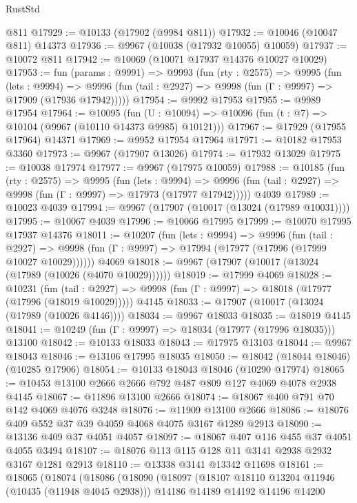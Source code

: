 \begin{lexlean}{RustStd}
\begin{coremodule}
    @811
@17929 := @10133 (@17902 (@9984 @811))
@17932 := @10046 (@10047 @811) @14373
@17936 := @9967 (@10038 (@17932 @10055) @10059)
@17937 := @10072 @811
@17942 := @10069 (@10071 @17937 @14376 @10027 @10029)
@17953 := fun (params : @9991) =>
  @9993
    (fun (rty : @2575) =>
    @9995
      (fun (lets : @9994) =>
      @9996 (fun (tail : @2927) => @9998 (fun (Γ : @9997) => @17909 (@17936 @17942)))))
@17954 := @9992 @17953
@17955 := @9989 @17954
@17964 := @10095
    (fun (U : @10094) => @10096 (fun (t : @7) => @10104 (@9967 (@10110 @14373 @9985) @10121)))
@17967 := @17929 (@17955 @17964) @14371
@17969 := @9952 @17954 @17964
@17971 := @10182 @17953 @3360
@17973 := @9967 (@17907 @13026)
@17974 := @17932 @13029
@17975 := @10038 @17974
@17977 := @9967 (@17975 @10059)
@17988 := @10185
    (fun (rty : @2575) =>
    @9995
      (fun (lets : @9994) =>
      @9996 (fun (tail : @2927) => @9998 (fun (Γ : @9997) => @17973 (@17977 @17942)))))
    @4039
@17989 := @10023 @4039
@17994 := @9967 (@17907 (@10017 (@13024 (@17989 @10031))))
@17995 := @10067 @4039
@17996 := @10066 @17995
@17999 := @10070 @17995 @17937 @14376
@18011 := @10207
    (fun (lets : @9994) =>
    @9996
      (fun (tail : @2927) =>
      @9998 (fun (Γ : @9997) => @17994 (@17977 (@17996 (@17999 @10027 @10029))))))
    @4069
@18018 := @9967 (@17907 (@10017 (@13024 (@17989 (@10026 (@4070 @10029))))))
@18019 := @17999 @4069
@18028 := @10231
    (fun (tail : @2927) => @9998 (fun (Γ : @9997) => @18018 (@17977 (@17996 (@18019 @10029)))))
    @4145
@18033 := @17907 (@10017 (@13024 (@17989 (@10026 @4146))))
@18034 := @9967 @18033
@18035 := @18019 @4145
@18041 := @10249 (fun (Γ : @9997) => @18034 (@17977 (@17996 @18035))) @13100
@18042 := @10133 @18033
@18043 := @17975 @13103
@18044 := @9967 @18043
@18046 := @13106 @17995 @18035
@18050 := @18042 (@18044 @18046) (@10285 @17906)
@18054 := @10133 @18043 @18046 (@10290 @17974)
@18065 := @10453 @13100 @2666 @2666 @792 @487 @809 @127 @4069 @4078 @2938 @4145
@18067 := @11896 @13100 @2666
@18074 := @18067 @400 @791 @70 @142 @4069 @4076 @3248
@18076 := @11909 @13100 @2666
@18086 := @18076 @409 @552 @37 @39 @4059 @4068 @4075 @3167 @1289 @2913
@18090 := @13136 @409 @37 @4051 @4057
@18097 := @18067 @407 @116 @455 @37 @4051 @4055 @3494
@18107 := @18076 @113 @115 @128 @11 @3141 @2938 @2932 @3167 @1281 @2913
@18110 := @13338 @3141 @13342 @11698
@18161 := @18065
    (@18074
      (@18086
        (@18090
          (@18097
            (@18107 @18110 @13204 @11946 (@10435 (@11948 @4045 @2938)))
            @14186
            @14189
            @14192
            @14196
            @14200

\end{coremodule}
\end{lexlean}
